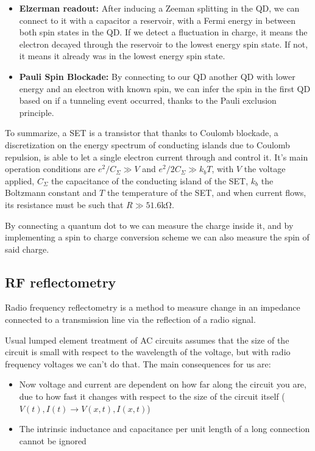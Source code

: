\documentclass[../main.tex]{subfiles}
\begin{document}
\begin{itemize}
    \item \textbf{Elzerman readout:} After inducing a Zeeman splitting in the
        QD, we can connect to it with a capacitor a reservoir,
         with a Fermi energy in between both spin states in the
        QD. If we detect a fluctuation in charge, it means the electron
        decayed through the reservoir to the lowest energy spin state. If
        not, it means it already was in the lowest energy spin state.
    \item \textbf{Pauli Spin Blockade:} By connecting to our QD another QD
        with lower energy and an electron with known spin, we can infer the
        spin in the first QD based on if a tunneling event occurred, thanks
        to the Pauli exclusion principle.
\end{itemize}

To summarize, a SET is a transistor that thanks to Coulomb blockade,
a discretization on the energy spectrum of conducting islands due to
Coulomb repulsion, is able to let a single electron current through and
control it. It's main operation conditions are \(e^2/C_{\Sigma} \gg V\)
and \(e^2/2C_{\Sigma} \gg k_{b}T\), with \(V\) the voltage applied,
\(C_{\Sigma}\) the capacitance of the conducting island of the SET, \(k_{b}\)
the Boltzmann constant and \(T\) the temperature of the SET, and when current
flows, its resistance must be such that \(R \gg 51.6\unit{\kilo\ohm}\).

By connecting a quantum dot to we can measure the charge inside it, and
by implementing a spin to charge conversion scheme we can also measure
the spin of said charge.

\newpage
\subsection{RF reflectometry}
Radio frequency reflectometry is a method to measure change in an impedance
connected to a transmission line via the reflection of a radio signal.

Usual lumped element treatment of AC circuits assumes that the size of the
circuit is small with respect to the wavelength of the voltage,
but with radio frequency voltages we can't do that. The main consequences for
us are:
\begin{itemize}
    \item Now voltage and current are dependent on how far along the circuit
    you are, due to how fast it changes with respect to the size of the circuit
    itself (\(V(t), I(t) \rightarrow V(x, t), I(x, t)\))
\item The intrinsic inductance and capacitance per unit length of a long
    connection cannot be ignored
\end{itemize}
\end{document}
